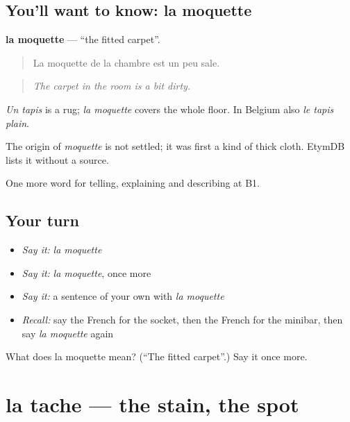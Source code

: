 \subsection*{You'll want to know: la moquette}
\textbf{la moquette} — \textquotedblleft{}the fitted carpet\textquotedblright{}.

\begin{quote}
La moquette de la chambre est un peu sale.
\end{quote}

\begin{quote}
\emph{The carpet in the room is a bit dirty.}
\end{quote}

\emph{Un tapis} is a rug; \emph{la moquette} covers the whole floor. In Belgium also \emph{le tapis plain}.

\begin{cousinweb}
The origin of \emph{moquette} is not settled; it was first a kind of thick cloth. EtymDB lists it without a source.
\end{cousinweb}

\begin{grammarlens}[title={What you've built}]
One more word for telling, explaining and describing at B1.
\end{grammarlens}

\subsection*{Your turn}
\begin{itemize}
\raggedright
  \item \emph{Say it:} \emph{la moquette}
  \item \emph{Say it:} \emph{la moquette}, once more
  \item \emph{Say it:} a sentence of your own with \emph{la moquette}
  \item \emph{Recall:} say the French for the socket, then the French for the minibar, then say \emph{la moquette} again
\end{itemize}

\begin{tcolorbox}[breakable,colback=teal!4,colframe=teal!35!black,title={Before you move on}]
What does la moquette mean? (\textquotedblleft{}The fitted carpet\textquotedblright{}.) Say it once more.
\end{tcolorbox}
\section[la tache]{la tache — the stain, the spot}

